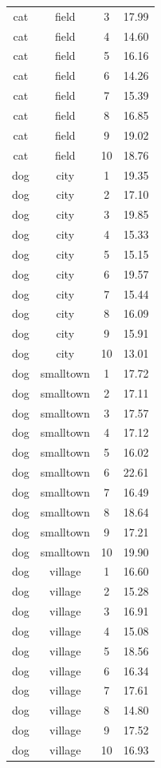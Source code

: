 \documentclass[
  letterpaper,
]{scrbook}
\begin{document}
\begin{longtable}[]{@{}cccc@{}}
cat & field & 3 & 17.99 \\
cat & field & 4 & 14.60 \\
cat & field & 5 & 16.16 \\
cat & field & 6 & 14.26 \\
cat & field & 7 & 15.39 \\
cat & field & 8 & 16.85 \\
cat & field & 9 & 19.02 \\
cat & field & 10 & 18.76 \\
dog & city & 1 & 19.35 \\
dog & city & 2 & 17.10 \\
dog & city & 3 & 19.85 \\
dog & city & 4 & 15.33 \\
dog & city & 5 & 15.15 \\
dog & city & 6 & 19.57 \\
dog & city & 7 & 15.44 \\
dog & city & 8 & 16.09 \\
dog & city & 9 & 15.91 \\
dog & city & 10 & 13.01 \\
dog & smalltown & 1 & 17.72 \\
dog & smalltown & 2 & 17.11 \\
dog & smalltown & 3 & 17.57 \\
dog & smalltown & 4 & 17.12 \\
dog & smalltown & 5 & 16.02 \\
dog & smalltown & 6 & 22.61 \\
dog & smalltown & 7 & 16.49 \\
dog & smalltown & 8 & 18.64 \\
dog & smalltown & 9 & 17.21 \\
dog & smalltown & 10 & 19.90 \\
dog & village & 1 & 16.60 \\
dog & village & 2 & 15.28 \\
dog & village & 3 & 16.91 \\
dog & village & 4 & 15.08 \\
dog & village & 5 & 18.56 \\
dog & village & 6 & 16.34 \\
dog & village & 7 & 17.61 \\
dog & village & 8 & 14.80 \\
dog & village & 9 & 17.52 \\
dog & village & 10 & 16.93 \\

\end{longtable}
\end{document}
